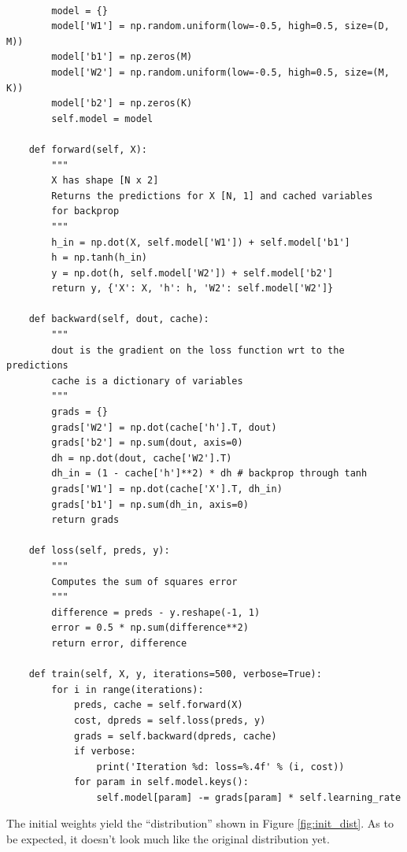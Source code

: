 \documentclass[a4paper]{article}
\begin{document}
\begin{enumerate}
\begin{lstlisting}
        
        model = {}
        model['W1'] = np.random.uniform(low=-0.5, high=0.5, size=(D, M))
        model['b1'] = np.zeros(M)
        model['W2'] = np.random.uniform(low=-0.5, high=0.5, size=(M, K))
        model['b2'] = np.zeros(K)
        self.model = model
        
    def forward(self, X):
        """
        X has shape [N x 2]
        Returns the predictions for X [N, 1] and cached variables
        for backprop
        """
        h_in = np.dot(X, self.model['W1']) + self.model['b1']
        h = np.tanh(h_in)
        y = np.dot(h, self.model['W2']) + self.model['b2']
        return y, {'X': X, 'h': h, 'W2': self.model['W2']}
    
    def backward(self, dout, cache):
        """
        dout is the gradient on the loss function wrt to the predictions
        cache is a dictionary of variables
        """
        grads = {}
        grads['W2'] = np.dot(cache['h'].T, dout)
        grads['b2'] = np.sum(dout, axis=0)
        dh = np.dot(dout, cache['W2'].T)
        dh_in = (1 - cache['h']**2) * dh # backprop through tanh
        grads['W1'] = np.dot(cache['X'].T, dh_in)
        grads['b1'] = np.sum(dh_in, axis=0)
        return grads
    
    def loss(self, preds, y):
        """
        Computes the sum of squares error
        """
        difference = preds - y.reshape(-1, 1)
        error = 0.5 * np.sum(difference**2)
        return error, difference
    
    def train(self, X, y, iterations=500, verbose=True):
        for i in range(iterations):
            preds, cache = self.forward(X)
            cost, dpreds = self.loss(preds, y)
            grads = self.backward(dpreds, cache)
            if verbose:
                print('Iteration %d: loss=%.4f' % (i, cost))
            for param in self.model.keys():
                self.model[param] -= grads[param] * self.learning_rate
\end{lstlisting}
The initial weights yield the ``distribution'' shown in Figure \ref{fig:init_dist}. As to be expected, it doesn't look much like the original distribution yet.


\end{enumerate}
\end{document}
